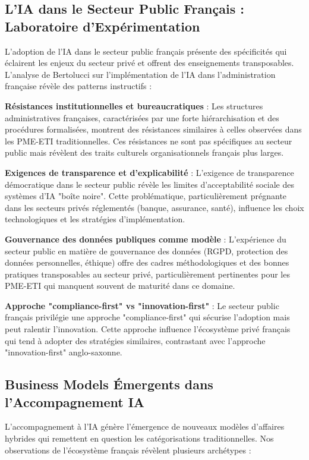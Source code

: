 \subsection{L'IA dans le Secteur Public Français : Laboratoire d'Expérimentation}

L'adoption de l'IA dans le secteur public français présente des spécificités qui éclairent les enjeux du secteur privé et offrent des enseignements transposables. L'analyse de Bertolucci \cite{bertolucci2024artificial} sur l'implémentation de l'IA dans l'administration française révèle des patterns instructifs :

\textbf{Résistances institutionnelles et bureaucratiques} : Les structures administratives françaises, caractérisées par une forte hiérarchisation et des procédures formalisées, montrent des résistances similaires à celles observées dans les PME-ETI traditionnelles. Ces résistances ne sont pas spécifiques au secteur public mais révèlent des traits culturels organisationnels français plus larges.

\textbf{Exigences de transparence et d'explicabilité} : L'exigence de transparence démocratique dans le secteur public révèle les limites d'acceptabilité sociale des systèmes d'IA "boîte noire". Cette problématique, particulièrement prégnante dans les secteurs privés réglementés (banque, assurance, santé), influence les choix technologiques et les stratégies d'implémentation.

\textbf{Gouvernance des données publiques comme modèle} : L'expérience du secteur public en matière de gouvernance des données (RGPD, protection des données personnelles, éthique) offre des cadres méthodologiques et des bonnes pratiques transposables au secteur privé, particulièrement pertinentes pour les PME-ETI qui manquent souvent de maturité dans ce domaine.

\textbf{Approche "compliance-first" vs "innovation-first"} : Le secteur public français privilégie une approche "compliance-first" qui sécurise l'adoption mais peut ralentir l'innovation. Cette approche influence l'écosystème privé français qui tend à adopter des stratégies similaires, contrastant avec l'approche "innovation-first" anglo-saxonne.

\subsection{Business Models Émergents dans l'Accompagnement IA}

L'accompagnement à l'IA génère l'émergence de nouveaux modèles d'affaires hybrides qui remettent en question les catégorisations traditionnelles. Nos observations de l'écosystème français révèlent plusieurs archétypes :

